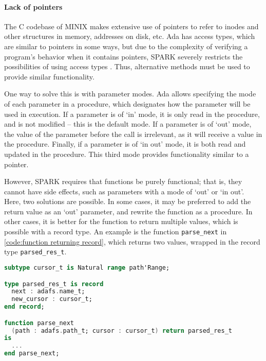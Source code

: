 \paragraph{Lack of pointers}
The C codebase of MINIX makes extensive use of pointers to refer to inodes and other structures in memory, addresses on disk, etc.
Ada has access types, which are similar to pointers in some ways, but due to the complexity of verifying a program's behavior when it contains pointers, SPARK severely restricts the possibilities of using access types \cite{sparkRM}.
Thus, alternative methods must be used to provide similar functionality.

One way to solve this is with parameter modes.
Ada allows specifying the mode of each parameter in a procedure, which designates how the parameter will be used in execution.
If a parameter is of `in' mode, it is only read in the procedure, and is not modified -- this is the default mode.
If a parameter is of `out' mode, the value of the parameter before the call is irrelevant, as it will receive a value in the procedure.
Finally, if a parameter is of `in out' mode, it is both read and updated in the procedure.
This third mode provides functionality similar to a pointer.

However, SPARK requires that functions be purely functional; that is, they cannot have side effects, such as parameters with a mode of `out' or `in out'.
Here, two solutions are possible.
In some cases, it may be preferred to add the return value as an `out' parameter, and rewrite the function as a procedure.
In other cases, it is better for the function to return multiple values, which is possible with a record type.
An example is the function \lstinline[language=Ada]{parse_next} in \autoref{code:function returning record}, which returns two values, wrapped in the record type \lstinline[language=Ada]{parsed_res_t}.

\begin{lstlisting}[float=tb,caption={Parse function returning the parsed component and the new cursor position (ellipses denote code omitted for brevity)}, label={code:function returning record}, language=Ada]
subtype cursor_t is Natural range path'Range;

type parsed_res_t is record
  next : adafs.name_t;
  new_cursor : cursor_t;
end record;

function parse_next
  (path : adafs.path_t; cursor : cursor_t) return parsed_res_t
is
  ...
end parse_next;
\end{lstlisting}

